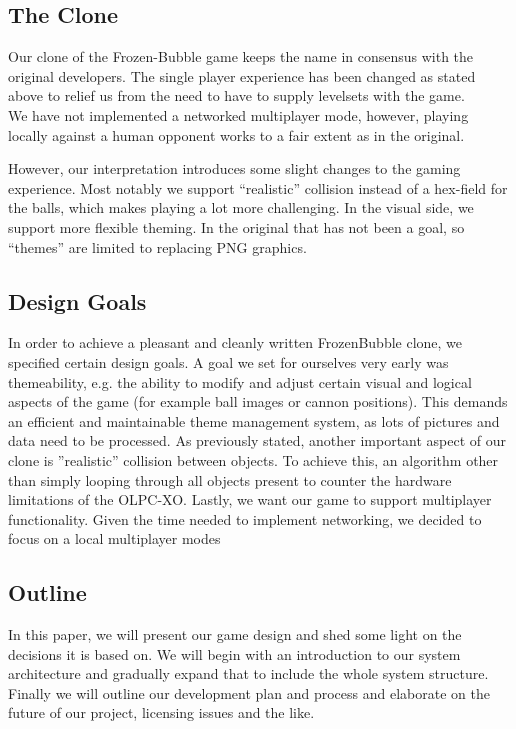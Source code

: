 \subsection{The Clone}
Our clone of the Frozen-Bubble game keeps the name in consensus with the original developers.
The single player experience has been changed as stated above to relief us from the need 
to have to supply levelsets with the game.\\
We have not implemented a networked multiplayer mode, however, playing locally against 
a human opponent works to a fair extent as in the original.

However, our interpretation introduces some slight changes to the gaming experience.
Most notably we support ``realistic'' collision instead of a hex-field for the balls, which
makes playing a lot more challenging. In the visual side, we support more flexible theming.
In the original that has not been a goal, so ``themes'' are limited to replacing 
PNG graphics.
%
\subsection{Design Goals}
In order to achieve a pleasant and cleanly written FrozenBubble clone, we specified certain design goals.
A goal we set for ourselves very early was themeability, e.g. the ability to modify and adjust certain visual and logical aspects of the game (for example ball images or cannon positions). This demands an efficient and maintainable theme management system, as lots of pictures and data need to be processed.
As previously stated, another important aspect of our clone is ''realistic'' collision between objects. To achieve this, an algorithm other than simply looping through all objects present to counter the hardware limitations of the OLPC-XO.
Lastly, we want our game to support multiplayer functionality. Given the time needed to implement networking, we decided to focus on a local multiplayer modes 

%
\subsection{Outline}
In this paper, we will present our game design and shed some light on the decisions 
it is based on. We will begin with an introduction to our system architecture and 
gradually expand that to include the whole system structure.\\
Finally we will outline our development plan and process and elaborate on the 
future of our project, licensing issues and the like.
%
